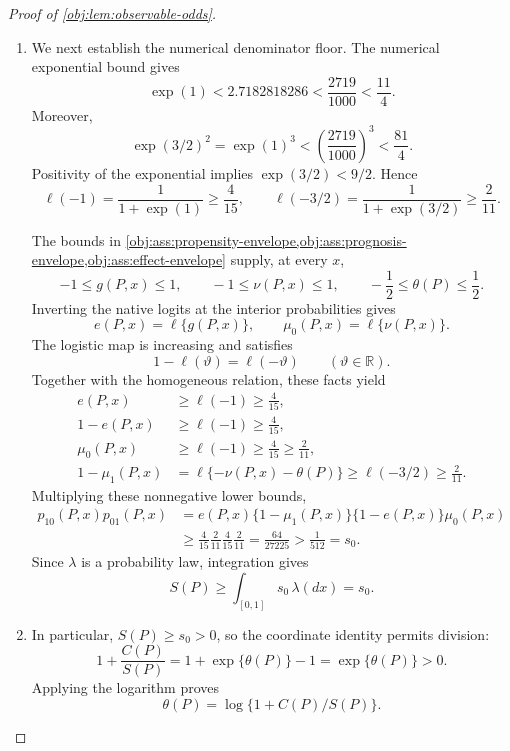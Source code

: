 \begin{proof}[Proof of \cref{obj:lem:observable-odds}]
\begin{enumerate}
\item We next establish the numerical denominator floor. The numerical exponential bound gives
\[
\exp(1)<2.7182818286<\frac{2719}{1000}<\frac{11}{4}.
\]
Moreover,
\[
\exp(3/2)^2=\exp(1)^3
<\left(\frac{2719}{1000}\right)^3
<\frac{81}{4}.
\]
Positivity of the exponential implies \(\exp(3/2)<9/2\). Hence
\[
\ell(-1)=\frac{1}{1+\exp(1)}\ge\frac4{15},
\qquad
\ell(-3/2)=\frac{1}{1+\exp(3/2)}\ge\frac2{11}.
\]

The bounds in
\cref{obj:ass:propensity-envelope,obj:ass:prognosis-envelope,obj:ass:effect-envelope}
supply, at every \(x\),
\[
-1\le g(P,x)\le1,\qquad
-1\le\nu(P,x)\le1,\qquad
-\frac12\le\theta(P)\le\frac12.
\]
Inverting the native logits at the interior probabilities gives
\[
e(P,x)=\ell\{g(P,x)\},\qquad
\mu_0(P,x)=\ell\{\nu(P,x)\}.
\]
The logistic map is increasing and satisfies
\[
1-\ell(\vartheta)=\ell(-\vartheta)
\qquad(\vartheta\in\mathbb R).
\]
Together with the homogeneous relation, these facts yield
\[
\begin{aligned}
e(P,x)&\ge\ell(-1)\ge\frac4{15},\\
1-e(P,x)&\ge\ell(-1)\ge\frac4{15},\\
\mu_0(P,x)&\ge\ell(-1)\ge\frac4{15}\ge\frac2{11},\\
1-\mu_1(P,x)
&=\ell\{-\nu(P,x)-\theta(P)\}
 \ge\ell(-3/2)\ge\frac2{11}.
\end{aligned}
\]
Multiplying these nonnegative lower bounds,
\[
\begin{aligned}
p_{10}(P,x)p_{01}(P,x)
&=e(P,x)\{1-\mu_1(P,x)\}\{1-e(P,x)\}\mu_0(P,x)\\
&\ge\frac4{15}\frac2{11}\frac4{15}\frac2{11}
=\frac{64}{27225}
>\frac1{512}=s_0.
\end{aligned}
\]
Since \(\lambda\) is a probability law, integration gives
\[
S(P)\ge\int_{[0,1]}s_0\,\lambda(dx)=s_0.
\]

\item In particular, \(S(P)\ge s_0>0\), so the coordinate identity permits division:
\[
1+\frac{C(P)}{S(P)}
=1+\exp\{\theta(P)\}-1
=\exp\{\theta(P)\}>0.
\]
Applying the logarithm proves
\[
\theta(P)=\log\{1+C(P)/S(P)\}.
\]


\end{enumerate}
\end{proof}
